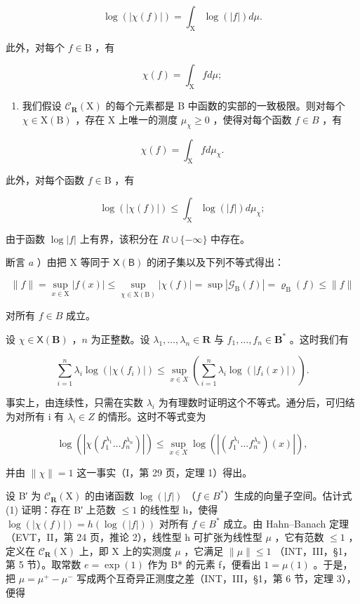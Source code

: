 \[
\log (| \chi (f) |) = \int_ {\mathrm{X}} \log (| f |) d \mu .
\]

此外，对每个 \(f \in \mathrm{B}\) ，有

\[
\chi (f) = \int_ {\mathrm{X}} f d \mu ;
\]

\begin{enumerate}
\def\labelenumi{\alph{enumi})}
\setcounter{enumi}{2}
\tightlist
\item
  我们假设 \(\mathcal{C}_{\mathbf{R}}(\mathrm{X})\) 的每个元素都是 B 中函数的实部的一致极限。则对每个 \(\chi \in \mathrm{X}(\mathrm{B})\) ，存在 X 上唯一的测度 \(\mu_{\chi} \geqslant 0\) ，使得对每个函数 \(f \in B\) ，有
\end{enumerate}

\[
\chi (f) = \int_ {\mathrm{X}} f d \mu_ {\chi}.
\]

此外，对每个函数 \(f \in \mathrm{B}\) ，有

\[
\log (| \chi (f) |) \leqslant \int_ {\mathrm{X}} \log (| f |) d \mu_ {\chi};
\]

由于函数 \(\log|f|\) 上有界，该积分在 \(R \cup \{-\infty\}\) 中存在。

断言 \(a\) ）由把 X 等同于 \(\mathsf{X}(\mathsf{B})\) 的闭子集以及下列不等式得出：

\[
\| f \| = \sup _ {x \in \mathrm{X}} | f (x) | \leqslant \sup _ {\chi \in \mathrm{X} (\mathrm{B})} | \chi (f) | = \sup | \mathcal {G} _ {\mathrm{B}} (f) | = \varrho_ {\mathrm{B}} (f) \leqslant \| f \|
\]

对所有 \(f \in B\) 成立。

设 \(\chi \in \mathsf{X}(\mathbf{B})\) ，\(n\) 为正整数。设 \(\lambda_1, \ldots, \lambda_n \in \mathbf{R}\) 与 \(f_1, \ldots, f_n \in \mathbf{B}^*\) 。这时我们有

\[
\sum_ {i = 1} ^ {n} \lambda_ {i} \log (| \chi (f _ {i}) |) \leqslant \sup _ {x \in X} \left(\sum_ {i = 1} ^ {n} \lambda_ {i} \log (| f _ {i} (x) |)\right).\tag{1}
\]

事实上，由连续性，只需在实数 \(\lambda_{i}\) 为有理数时证明这个不等式。通分后，可归结为对所有 i 有 \(\lambda_{i} \in Z\) 的情形。这时不等式变为

\[
\log \left(\left| \chi \left(f _ {1} ^ {\lambda_ {1}} \dots f _ {n} ^ {\lambda_ {n}}\right) \right|\right) \leqslant \sup _ {x \in X} \log \left(\left| \left(f _ {1} ^ {\lambda_ {1}} \dots f _ {n} ^ {\lambda_ {n}}\right) (x) \right|\right),
\]

并由 \(\|\chi\|=1\) 这一事实（I，第 29 页，定理 1）得出。

设 B′ 为 \(\mathcal{C}_{\mathbf{R}}(\mathrm{X})\) 的由诸函数 \(\log(|f|)\) （\(f \in B^{*}\)）生成的向量子空间。估计式 (1) 证明：存在 B′ 上范数 \(\leqslant 1\) 的线性型 h，使得 \(\log(|\chi(f)|) = h(\log(|f|))\) 对所有 \(f \in B^{*}\) 成立。由 Hahn–Banach 定理（EVT，II，第 24 页，推论 2），线性型 h 可扩张为线性型 \(\mu\) ，它有范数 \(\leqslant 1\) ，定义在 \(\mathcal{C}_{\mathbf{R}}(\mathrm{X})\) 上，即 X 上的实测度 \(\mu\) ，它满足 \(\|\mu\| \leqslant 1\) （INT，III，§1，第 5 节）。取常数 \(e = \exp(1)\) 作为 B* 的元素 f，便看出 \(1 = \mu(1)\) 。于是，把 \(\mu = \mu^{+} - \mu^{-}\) 写成两个互奇异正测度之差（INT，III，§1，第 6 节，定理 3），便得

